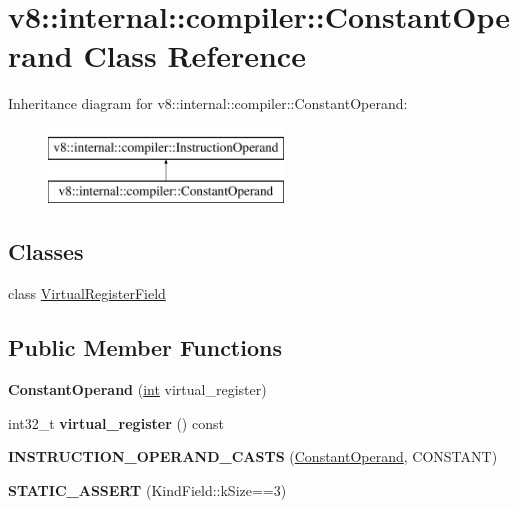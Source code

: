 \hypertarget{classv8_1_1internal_1_1compiler_1_1ConstantOperand}{}\section{v8\+:\+:internal\+:\+:compiler\+:\+:Constant\+Operand Class Reference}
\label{classv8_1_1internal_1_1compiler_1_1ConstantOperand}
Inheritance diagram for v8\+:\+:internal\+:\+:compiler\+:\+:Constant\+Operand\+:\begin{figure}[H]
\begin{center}
\leavevmode
\includegraphics[height=2.000000cm]{classv8_1_1internal_1_1compiler_1_1ConstantOperand}
\end{center}
\end{figure}
\subsection*{Classes}
\begin{DoxyCompactItemize}
\item 
class \mbox{\hyperlink{classv8_1_1internal_1_1compiler_1_1ConstantOperand_1_1VirtualRegisterField}{Virtual\+Register\+Field}}
\end{DoxyCompactItemize}
\subsection*{Public Member Functions}
\begin{DoxyCompactItemize}
\item 
\mbox{\label{classv8_1_1internal_1_1compiler_1_1ConstantOperand_a42e57d2fe0940dcfe93ae1effd687bf7}} 
{\bfseries Constant\+Operand} (\mbox{\hyperlink{classint}{int}} virtual\+\_\+register)
\item 
\mbox{\label{classv8_1_1internal_1_1compiler_1_1ConstantOperand_ab0c1434f008b3261f2642c80182563f2}} 
int32\+\_\+t {\bfseries virtual\+\_\+register} () const
\item 
\mbox{\label{classv8_1_1internal_1_1compiler_1_1ConstantOperand_a20b1c2502d9b6613738d3ccc8f4e81b3}} 
{\bfseries I\+N\+S\+T\+R\+U\+C\+T\+I\+O\+N\+\_\+\+O\+P\+E\+R\+A\+N\+D\+\_\+\+C\+A\+S\+TS} (\mbox{\hyperlink{classv8_1_1internal_1_1compiler_1_1ConstantOperand}{Constant\+Operand}}, C\+O\+N\+S\+T\+A\+NT)
\item 
\mbox{\label{classv8_1_1internal_1_1compiler_1_1ConstantOperand_a17c945feeae866b585e30b71bb09dfe2}} 
{\bfseries S\+T\+A\+T\+I\+C\+\_\+\+A\+S\+S\+E\+RT} (Kind\+Field\+::k\+Size==3)
\end{DoxyCompactItemize}
